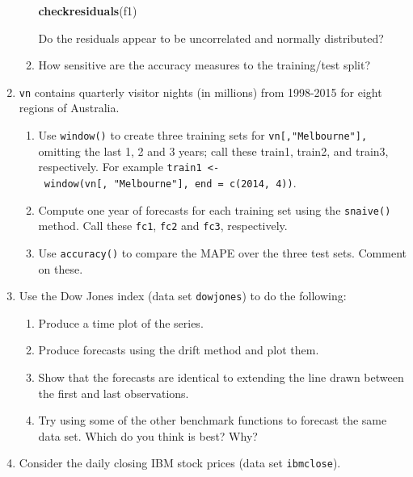 \documentclass[]{book}
\newenvironment{Shaded}{\begin{snugshade}}{\end{snugshade}}
\newcommand{\KeywordTok}[1]{\textcolor[rgb]{0.13,0.29,0.53}{\textbf{#1}}}
\newcommand{\NormalTok}[1]{#1}
\providecommand{\tightlist}{%
  \setlength{\itemsep}{0pt}\setlength{\parskip}{0pt}}
\begin{document}
\begin{enumerate}
\begin{enumerate}
\begin{Shaded}
\begin{Highlighting}[]
\KeywordTok{checkresiduals}\NormalTok{(f1)}
\end{Highlighting}
\end{Shaded}

    Do the residuals appear to be uncorrelated and normally distributed?
  \item
    How sensitive are the accuracy measures to the training/test split?
  \end{enumerate}
\item
  \texttt{vn} contains quarterly visitor nights (in millions) from 1998-2015 for eight regions of Australia.

  \begin{enumerate}
  \def\labelenumii{\alph{enumii}.}
  \item
    Use \texttt{window()} to create three training sets for \texttt{vn{[},"Melbourne"{]},} omitting the last 1, 2 and 3 years; call these train1, train2, and train3, respectively. For example \texttt{train1\ \textless{}-\ window(vn{[},\ "Melbourne"{]},\ end\ =\ c(2014,\ 4))}.
  \item
    Compute one year of forecasts for each training set using the \texttt{snaive()} method. Call these \texttt{fc1}, \texttt{fc2} and \texttt{fc3}, respectively.
  \item
    Use \texttt{accuracy()} to compare the MAPE over the three test sets. Comment on these.
  \end{enumerate}
\item
  Use the Dow Jones index (data set \texttt{dowjones}) to do the following:

  \begin{enumerate}
  \def\labelenumii{\alph{enumii}.}
  \tightlist
  \item
    Produce a time plot of the series.
  \item
    Produce forecasts using the drift method and plot them.
  \item
    Show that the forecasts are identical to extending the line drawn between the first and last observations.
  \item
    Try using some of the other benchmark functions to forecast the same data set. Which do you think is best? Why?
  \end{enumerate}
\item
  Consider the daily closing IBM stock prices (data set \texttt{ibmclose}).


\end{enumerate}
\end{document}
